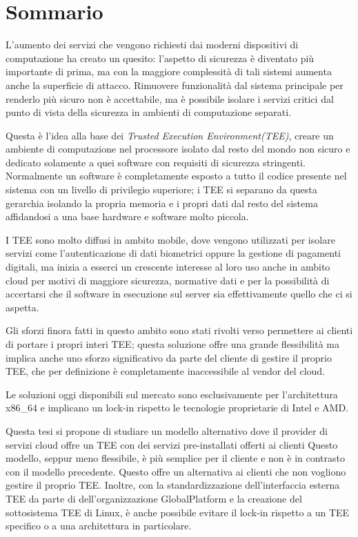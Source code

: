 \documentclass[12pt,italian]{report}
\begin{document}
\frontespizio
\afterpreface

\chapter*{Sommario}
\label{cap:sommario}
L'aumento dei servizi che vengono richiesti dai moderni dispositivi di
computazione ha creato un quesito: l'aspetto di sicurezza è diventato più
importante di prima, ma con la maggiore complessità di tali sistemi aumenta
anche la superficie di attacco.
Rimuovere funzionalità dal sistema principale per renderlo più sicuro non
è accettabile, ma è possibile isolare i servizi critici dal punto di vista
della sicurezza in ambienti di computazione separati.

Questa è l'idea alla base dei \textit{Trusted Execution Environment(TEE)},
creare un ambiente di computazione nel processore isolato dal resto del
mondo non sicuro e dedicato solamente a quei software con requisiti di
sicurezza stringenti.
Normalmente un software è completamente esposto a tutto il codice
presente nel sistema con un livello di privilegio superiore;
i TEE si separano da questa gerarchia isolando la propria memoria e i propri
dati dal resto del sistema affidandosi a una base hardware e software
molto piccola.

I TEE sono molto diffusi in ambito mobile, dove vengono utilizzati per
isolare servizi come l'autenticazione di dati biometrici oppure la gestione
di pagamenti digitali, ma inizia a esserci un crescente interesse al loro
uso anche in ambito cloud per motivi di maggiore sicurezza, normative dati e 
per la possibilità di accertarsi che il software in esecuzione sul server
sia effettivamente quello che ci si aspetta.

Gli sforzi finora fatti in questo ambito sono stati rivolti verso permettere
ai clienti di portare i propri interi TEE; questa soluzione offre una grande
flessibilità ma implica anche uno sforzo significativo da parte del cliente
di gestire il proprio TEE, che per definizione è completamente inaccessibile
al vendor del cloud.

Le soluzioni oggi disponibili sul mercato sono esclusivamente per
l'architettura x86\_64 e implicano un lock-in rispetto le tecnologie
proprietarie di Intel e AMD.

Questa tesi si propone di studiare un modello alternativo dove il provider
di servizi cloud offre un TEE con dei servizi pre-installati offerti ai
clienti
Questo modello, seppur meno flessibile, è più semplice per il cliente e non
è in contrasto con il modello precedente. Questo offre un alternativa
ai clienti che non vogliono gestire il proprio TEE.
Inoltre, con la standardizzazione dell'interfaccia esterna TEE da parte di
dell'organizzazione GlobalPlatform e la creazione del sottosistema TEE
di Linux, è anche possibile evitare il lock-in rispetto a un TEE specifico
o a una architettura in particolare.
\end{document}
